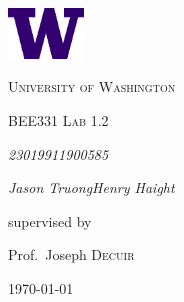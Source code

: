\documentclass[9pt,a4paper]{report}
\begin{document}
	\begin{titlepage}
		\centering
		\vspace*{1.5in}
		\includegraphics[width=0.15\textwidth]{W-Logo_Purple_RGB}\par\vspace{1cm}
		{\LARGE \textsc{University of Washington}\par}
		\vspace{1cm}
		{\Large \textsc{BEE331 Lab 1.2}\par}
		\vspace{1.5cm}
		{\huge\bfseries \par}
		\vspace{2cm}
		{\Large\itshape 2301991\hspace{55pt}1900585\par}
		{\Large\itshape Jason Truong\hspace{31pt}Henry Haight\par}
		\vfill
		supervised by\par
		Prof.~Joseph \textsc{Decuir}
		\date{2024\\ January}
		\vfill
		{\large \today\par}
		\vspace*{1.5in}
	\end{titlepage}
	
\end{document}
